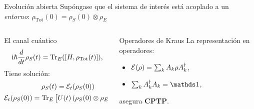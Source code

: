 \begin{frame}{Evolución abierta}
    Supóngase que el sistema de interés está acoplado a un \textit{entorno}: $\rho_{\text{Tot}}(0)=\rho_{S}(0)\otimes\rho_{E}$
    \begin{columns}
        \begin{column}{0.5\textwidth}
            \begin{block}{El canal cuántico}
            \begin{align}
                \rmi\hbar\frac{d}{d t} \rho_{S}(t)=\Tr_{E}([H,\rho_{\text{Tot}}(t)])\rlap{,}\nonumber
            \end{align}\pause
            Tiene solución:
            \begin{equation}
                \begin{gathered}
                \rho_{S}(t)=\mathcal{E}_{t}(\rho_{S}(0))\\
                \mathcal{E}_{t}(\rho_{S}(0))=\Tr_{E}\qty[U(t)\left(\rho_{S}(0)\otimes\rho_{E}\right)U^{\dag}(t)]
            \end{gathered}\nonumber
            \end{equation}
            \end{block}
        \end{column}
        \pause
        \begin{column}{0.5\textwidth}
            \begin{block}{Operadores de Kraus}
                \vspace{0.5cm}
                La representación en operadores:
                \vspace{0.3cm}
            \begin{itemize}
                \item $\mathcal{E}(\rho)=\sum_{k}A_{k}\rho A^{\dagger}_{k}$,\pause
                \item $\sum_{k}A_{k}^{\dagger}A_{k}=\Id$,
            \end{itemize}
            \vspace{0.3cm}
            asegura \textbf{CPTP}.
            \vspace{0.5cm}
        \end{block}
        \end{column}
    \end{columns}
\end{frame}



